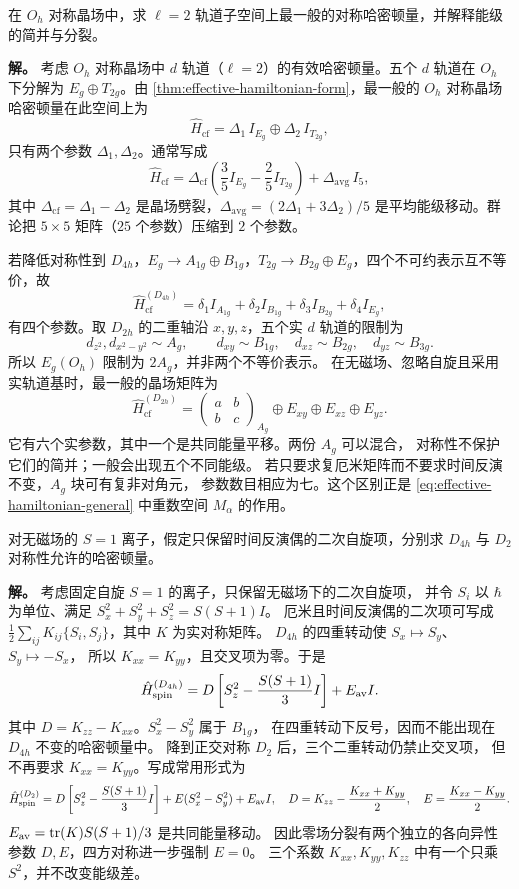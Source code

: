 \begin{example}[{晶场哈密顿量的对称性构造}]
在 $O_h$ 对称晶场中，求 $\ell=2$ 轨道子空间上最一般的对称哈密顿量，并解释能级的简并与分裂。

\textbf{解。} 考虑 $O_h$ 对称晶场中 $d$ 轨道（$\ell=2$）的有效哈密顿量。五个 $d$ 轨道在 $O_h$ 下分解为 $E_g\oplus T_{2g}$。由 \cref{thm:effective-hamiltonian-form}，最一般的 $O_h$ 对称晶场哈密顿量在此空间上为
\[
\hat H_{\mathrm{cf}}=\Delta_1\,I_{E_g}\oplus\Delta_2\,I_{T_{2g}},
\]
只有两个参数 $\Delta_1,\Delta_2$。通常写成
\[
\hat H_{\mathrm{cf}}=\Delta_{\mathrm{cf}}\left(\frac{3}{5}I_{E_g}-\frac{2}{5}I_{T_{2g}}\right)+\Delta_{\mathrm{avg}}\,I_5,
\]
其中 $\Delta_{\mathrm{cf}}=\Delta_1-\Delta_2$ 是晶场劈裂，$\Delta_{\mathrm{avg}}=(2\Delta_1+3\Delta_2)/5$ 是平均能级移动。群论把 $5\times5$ 矩阵（$25$ 个参数）压缩到 $2$ 个参数。

若降低对称性到 $D_{4h}$，$E_g\to A_{1g}\oplus B_{1g}$，$T_{2g}\to B_{2g}\oplus E_g$，四个不可约表示互不等价，故
\[
\hat H_{\mathrm{cf}}^{(D_{4h})}=\delta_1 I_{A_{1g}}+\delta_2 I_{B_{1g}}+\delta_3 I_{B_{2g}}+\delta_4 I_{E_g},
\]
有四个参数。取 $D_{2h}$ 的二重轴沿 $x,y,z$，五个实 $d$ 轨道的限制为
\[
d_{z^2},d_{x^2-y^2}\sim A_g,\qquad
d_{xy}\sim B_{1g},\quad d_{xz}\sim B_{2g},\quad d_{yz}\sim B_{3g}.
\]
所以 $E_g(O_h)$ 限制为 $2A_g$，并非两个不等价表示。
在无磁场、忽略自旋且采用实轨道基时，最一般的晶场矩阵为
\[
\hat H_{\mathrm{cf}}^{(D_{2h})}
=\begin{pmatrix}a&b\\b&c\end{pmatrix}_{A_g}
\oplus E_{xy}\oplus E_{xz}\oplus E_{yz}.
\]
它有六个实参数，其中一个是共同能量平移。两份 $A_g$ 可以混合，
对称性不保护它们的简并；一般会出现五个不同能级。
若只要求复厄米矩阵而不要求时间反演不变，$A_g$ 块可有复非对角元，
参数数目相应为七。这个区别正是 \cref{eq:effective-hamiltonian-general}
中重数空间 $M_\alpha$ 的作用。
\end{example}

\begin{example}[{自旋哈密顿量的对称性推导}]
对无磁场的 $S=1$ 离子，假定只保留时间反演偶的二次自旋项，分别求 $D_{4h}$ 与 $D_2$ 对称性允许的哈密顿量。

\textbf{解。} 考虑固定自旋 $S=1$ 的离子，只保留无磁场下的二次自旋项，
并令 $S_i$ 以 $\hbar$ 为单位、满足 $S_x^2+S_y^2+S_z^2=S(S+1)I$。
厄米且时间反演偶的二次项可写成
$\tfrac12\sum_{ij}K_{ij}\{S_i,S_j\}$，其中 $K$ 为实对称矩阵。
$D_{4h}$ 的四重转动使 $S_x\mapsto S_y$、$S_y\mapsto-S_x$，
所以 $K_{xx}=K_{yy}$，且交叉项为零。于是
\[
\hat H_{\mathrm{spin}}^{(D_{4h})}
=D\left[S_z^2-\frac{S(S+1)}3I\right]+E_{\rm av}I.
\]
其中 $D=K_{zz}-K_{xx}$。$S_x^2-S_y^2$ 属于 $B_{1g}$，
在四重转动下反号，因而不能出现在 $D_{4h}$ 不变的哈密顿量中。
降到正交对称 $D_2$ 后，三个二重转动仍禁止交叉项，
但不再要求 $K_{xx}=K_{yy}$。写成常用形式为
\[
\hat H_{\mathrm{spin}}^{(D_2)}
=D\left[S_z^2-\frac{S(S+1)}3I\right]
+E(S_x^2-S_y^2)+E_{\rm av}I,
\quad
D=K_{zz}-\frac{K_{xx}+K_{yy}}2,\quad
E=\frac{K_{xx}-K_{yy}}2.
\]
$E_{\rm av}=\operatorname{tr}(K)S(S+1)/3$ 是共同能量移动。
因此零场分裂有两个独立的各向异性参数 $D,E$，四方对称进一步强制 $E=0$。
三个系数 $K_{xx},K_{yy},K_{zz}$ 中有一个只乘 $S^2$，并不改变能级差。
\end{example}

